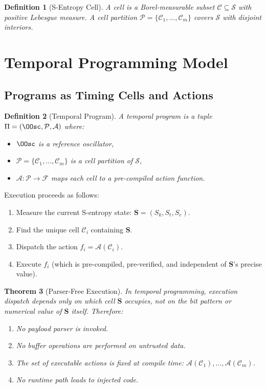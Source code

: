 \documentclass[twocolumn,11pt,a4paper]{article}
\newtheorem{theorem}{Theorem}[section]
\newtheorem{definition}[theorem]{Definition}
\newcommand{\Sk}{S_k}
\newcommand{\St}{S_t}
\newcommand{\Se}{S_e}
\newcommand{\Stuple}{\mathbf{S}}
\newcommand{\calC}{\mathcal{C}}
\newcommand{\calP}{\mathcal{P}}
\newcommand{\calS}{\mathcal{S}}
\begin{document}
\begin{definition}[S-Entropy Cell]
A \emph{cell} is a Borel-measurable subset $\calC \subseteq \calS$ with positive Lebesgue measure. A \emph{cell partition} $\calP = \{\calC_1, \ldots, \calC_m\}$ covers $\calS$ with disjoint interiors.
\end{definition}

\section{Temporal Programming Model}
\label{sec:temporal}

\subsection{Programs as Timing Cells and Actions}

\begin{definition}[Temporal Program]
A \emph{temporal program} is a tuple $\Pi = (\OOsc, \calP, \mathcal{A})$ where:
\begin{itemize}[nosep,leftmargin=1em]
  \item $\OOsc$ is a reference oscillator,
  \item $\calP = \{\calC_1, \ldots, \calC_m\}$ is a cell partition of $\calS$,
  \item $\mathcal{A}: \calP \to \mathcal{F}$ maps each cell to a pre-compiled action function.
\end{itemize}
\end{definition}

Execution proceeds as follows:
\begin{enumerate}[nosep]
  \item Measure the current S-entropy state: $\Stuple = (\Sk, \St, \Se)$.
  \item Find the unique cell $\calC_i$ containing $\Stuple$.
  \item Dispatch the action $f_i = \mathcal{A}(\calC_i)$.
  \item Execute $f_i$ (which is pre-compiled, pre-verified, and independent of $\Stuple$'s precise value).
\end{enumerate}

\begin{theorem}[Parser-Free Execution]
In temporal programming, execution dispatch depends only on which cell $\Stuple$ occupies, not on the bit pattern or numerical value of $\Stuple$ itself. Therefore:
\begin{enumerate}[nosep,label=(\roman*)]
  \item No payload parser is invoked.
  \item No buffer operations are performed on untrusted data.
  \item The set of executable actions is fixed at compile time: $\mathcal{A}(\calC_1), \ldots, \mathcal{A}(\calC_m)$.
  \item No runtime path leads to injected code.
\end{enumerate}
\end{theorem}
\end{document}
